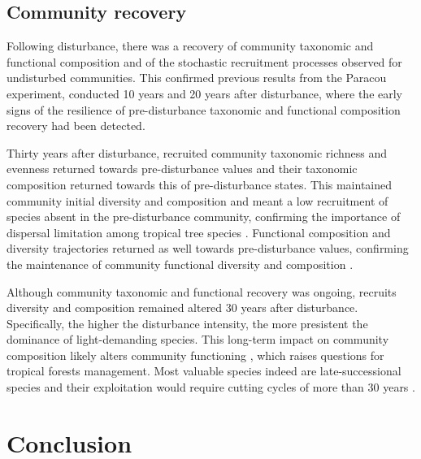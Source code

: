 \documentclass[fleqn,10pt]{ArtEcoFoG} %
\begin{document}
\subsection{Community recovery}\label{community-recovery}

Following disturbance, there was a recovery of community taxonomic and
functional composition and of the stochastic recruitment processes
observed for undisturbed communities. This confirmed previous results
from the Paracou experiment, conducted 10 years \citep{Molino2001} and
20 years \citep{Baraloto2012a} after disturbance, where the early signs
of the resilience of pre-disturbance taxonomic and functional
composition recovery had been detected.

Thirty years after disturbance, recruited community taxonomic richness
and evenness returned towards pre-disturbance values and their taxonomic
composition returned towards this of pre-disturbance states. This
maintained community initial diversity and composition and meant a low
recruitment of species absent in the pre-disturbance community,
confirming the importance of dispersal limitation among tropical tree
species \citep{Svenning2005}. Functional composition and diversity
trajectories returned as well towards pre-disturbance values, confirming
the maintenance of community functional diversity and composition
\citep{Fukami2005, Fortunel2014}.

Although community taxonomic and functional recovery was ongoing,
recruits diversity and composition remained altered 30 years after
disturbance. Specifically, the higher the disturbance intensity, the
more presistent the dominance of light-demanding species. This long-term
impact on community composition likely alters community functioning
\citep{Diaz2005}, which raises questions for tropical forests
management. Most valuable species indeed are late-successional species
and their exploitation would require cutting cycles of more than 30
years \citep{Putz2012}.

\section{Conclusion}\label{conclusion}
\end{document}
